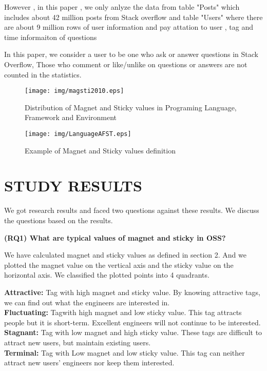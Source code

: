 \documentclass[conference]{IEEEtran}
\begin{document}
However , in this paper , we only anlyze the data from table "Posts" which includes about 42 million posts from Stack overflow and table "Users" where there are about 9 million rows of user information and pay attation to user , tag and time informaiton of questions

In this paper, we consider a user to be one who ask or answer questions in Stack Overflow, Those who comment or like/unlike on questions or answers are not counted in the statistics.

\begin{figure*}[t]
 \centering
 \texttt{[image: img/magsti2010.eps]}  
 \caption{Distribution of Magnet and Sticky values in Programing Language, Framework and Environment} 
 \label{fig:plotframe2010} 
\end{figure*}

\begin{figure}[t]
 \centering
 \texttt{[image: img/LanguageAFST.eps]}  
 \caption{Example of Magnet and Sticky values definition} 
 \label{fig:example1zs} 
\end{figure}
\smallskip
\smallskip



\section{STUDY RESULTS} %
We got research results and faced two questions against these results. We discuss the questions based on the results.
\smallskip
\smallskip

\textbf{(RQ1) What are typical values of magnet and sticky in OSS?}
\smallskip

We have calculated magnet and sticky values as defined in section 2. And we plotted the magnet value on the vertical axis and the sticky value on the horizontal axis. We classified the plotted points into 4 quadrants.
\smallskip
\smallskip

\textbf{Attractive:} Tag with high magnet and sticky value. By knowing attractive tags, we can find out what the engineers are interested in.\\
\textbf{Fluctuating:} Tagwith high magnet and low sticky value. This tag attracts people but it is short-term. Excellent engineers will not continue to be interested.\\
\textbf{Stagnant:} Tag with low magnet and high sticky value. These tags are difficult to attract new users, but maintain existing users.\\
\textbf{Terminal:} Tag with Low magnet and low sticky value. This tag can neither attract new users' engineers nor keep them interested.
\smallskip
\smallskip
\end{document}
